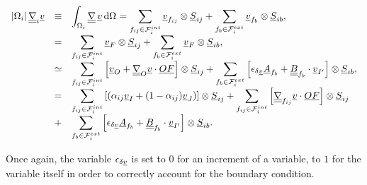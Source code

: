 \begin{equation}\label{eq:compute_gradrv1}
\begin{array}{r c l}
\left| \Omega_{i} \right| \underline{\underline{\nabla}}_{i} \underline{v} &
\equiv & \displaystyle
\int_{\Omega_{i}}{\underline{\underline{\nabla}} \, \underline{v} \, \mathrm{d} \Omega_{} }
= \sum\limits_{ {f_{ij}} \in \mathcal{F}^{int}_{i}}
\underline{v}_{{f_{ij}}} \otimes {\underline{S}_{{ij}}}
+\sum\limits_{ {f_{b}} \in \mathcal{F}^{ext}_{i}}
\underline{v}_{{f_{b}}} \otimes {\underline{S}_{{ib}}}, \\
&=& \displaystyle
 \sum\limits_{ {f_{ij}} \in \mathcal{F}^{int}_{i}}
\underline{v}_{F} \otimes {\underline{S}_{{ij}}}
+\sum\limits_{ {f_{b}} \in \mathcal{F}^{ext}_{i}}
\underline{v}_{F} \otimes {\underline{S}_{{ib}}}, \\
&\simeq &  \displaystyle
\sum\limits_{ {f_{ij}} \in \mathcal{F}^{int}_{i}} \left[ \underline{v}_{O}+ \underline{\underline{\nabla}}_{O} \underline{v} \cdot \underline{O F} \right] \otimes \underline{S}_{{ij}}+
\sum\limits_{ {f_{b}} \in \mathcal{F}^{ext}_{i}} \left[ \epsilon_{\delta \underline{v}} \underline{A}_{{f_{b}}} + \underline{\underline{B}}_{{f_{b}}} \cdot \underline{v}_{{I^\prime}} \right] \otimes\underline{S}_{{ib}} ,\\
 & = &\displaystyle
\sum\limits_{ {f_{ij}} \in \mathcal{F}^{int}_{i}}
\left[
\left( \alpha_{{ij}} \underline{v}_I +
(1 - \alpha_{{ij}}) \underline{v}_J \right) \right] \otimes \underline{S}_{{ij}} +
\sum\limits_{ {f_{ij}} \in \mathcal{F}^{int}_{i}} \left[
\underline{\underline{\nabla}}_{{f_{ij}}} \underline{v}  \cdot  \underline{O F} \right] \otimes \underline{S}_{{ij}} \\
&+&\displaystyle
\sum\limits_{ {f_{b}} \in \mathcal{F}^{ext}_{i}} \left[ \epsilon_{\delta \underline{v}} \underline{A}_{{f_{b}}} + \underline{\underline{B}}_{{f_{b}}} \cdot \underline{v}_{{I^\prime}} \right] \otimes \underline{S}_{{ib}} .
\end{array}
\end{equation}

Once again, the variable $\epsilon_{\delta \underline{v}}$ is set to $0$ for an increment of a variable,
 to $1$ for the variable itself in order to correctly account for the boundary condition.

